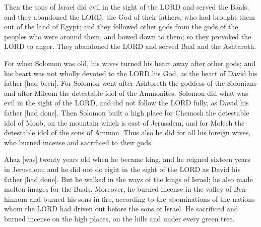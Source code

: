 \vspace{2\baselineskip}

\begin{scripture}[Judges 2:11-13]
    Then 
    the sons of Israel did evil in the sight of the LORD and served the Baals,
    and they abandoned the LORD, the God of their fathers, who had brought them out of the land of Egypt; and they followed other gods from the gods of the peoples who were around them, and bowed down to them; so they provoked the LORD to anger.
    They abandoned the LORD and served Baal and the Ashtaroth.
\end{scripture}

\vspace{2\baselineskip}

\begin{scripture}[1 Kings 11:4-8]
    For when Solomon was old, his wives turned his heart away after other gods; and his heart was not wholly devoted to the LORD his God, as the heart of David his father [had been].
    For Solomon went after Ashtoreth the goddess of the Sidonians and after Milcom the detestable idol of the Ammonites.
    Solomon did what was evil in the sight of the LORD, and did not follow the LORD fully, as David his father [had done].
    Then Solomon built a high place for Chemosh the detestable idol of Moab, on the mountain which is east of Jerusalem, and for Molech the detestable idol of the sons of Ammon.
    Thus also he did for all his foreign wives, who burned incense and sacrificed to their gods.
\end{scripture}

\vspace{2\baselineskip}

\begin{scripture}[2 Chronicles 28:1-4]
    Ahaz [was] twenty years old when he became king, and he reigned sixteen years in Jerusalem; and he did not do right in the sight of the LORD as David his father [had done].
    But he walked in the ways of the kings of Israel; he also made molten images for the Baals.
    Moreover, he burned incense in the valley of Ben-hinnom and burned his sons in fire, according to the abominations of the nations whom the LORD had driven out before the sons of Israel.
    He sacrificed and burned incense on the high places, on the hills and under every green tree.
\end{scripture}

